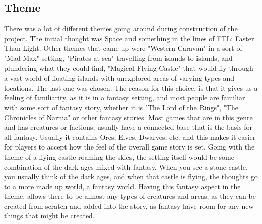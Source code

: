 \subsection{Theme}
\label{sec:theme}
There was a lot of different themes going around during construction of the project. The initial thought was Space and something in the lines of FTL: Faster Than Light. 
Other themes that came up were "Western Caravan" in a sort of "Mad Max" setting, "Pirates at sea" travelling from islands to islands, and plundering what they could find, "Magical Flying Castle" that would fly through a vast world of floating islands with unexplored areas of varying types and locations.
The last one was chosen. The reason for this choice, is that it gives us a feeling of familiarity, as it is in a fantasy setting, and most people are familiar with some sort of fantasy story, whether it is "The Lord of the Rings", "The Chronicles of Narnia" or other fantasy stories. Most games that are in this genre and has creatures or factions, usually have a connected base that is the basis for all fantasy. Usually it contains Orcs, Elves, Dwarves, etc. and this makes it easier for players to accept how the feel of the overall game story is set. 
Going with the theme of a flying castle roaming the skies, the setting itself would be some combination of the dark ages mixed with fantasy. When you see a stone castle, you usually think of the dark ages, and when that castle is flying, the thoughts go to a more made up world, a fantasy world. 
Having this fantasy aspect in the theme, allows there to be almost any types of creatures and areas, as they can be created from scratch and added into the story, as fantasy have room for any new things that might be created.

